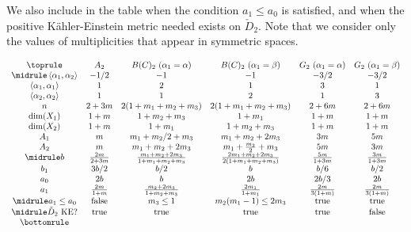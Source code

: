 \documentclass[JEP,XML,SOM,Unicode, NoEqCountersInSection, NoFloatCountersInSection]{cedram}
\theoremstyle{plain}
\theoremstyle{definition}
\begin{document}
We also include in the table when the condition $a_1\leq a_0$ is satisfied,
and when the positive Kähler-Einstein metric needed exists on $\check{D}_2$.
Note that we consider only the values of multiplicities that appear in symmetric spaces.

\begin{table}
\begin{small}
\begin{equation*}
\begin{array}{cccccc}
\toprule
& A_2 & B(C)_2~(\alpha_1=\alpha) & B(C)_2~(\alpha_1=\beta) & G_2~(\alpha_1=\alpha) & G_2~(\alpha_1=\beta) \\
\midrule
\left<\alpha_1,\alpha_2\right> & -1/2 & -1 & -1 & -3/2 & -3/2\\
\left<\alpha_1,\alpha_1\right> & 1 & 2 &1 & 3 & 1\\
\left<\alpha_2,\alpha_2\right> & 1 & 1 &2 & 1 & 3\\
n & 2+3m & 2(1+m_1+m_2+m_3) & 2(1+m_1+m_2+m_3) & 2+6m & 2+6m \\
\dim(X_1) & 1+m & 1+m_2+m_3 & 1+m_1 & 1+m & 1+m \\
\dim(X_2) & 1+m & 1+m_1 & 1+m_2+m_3 & 1+m & 1+m \\
A_1 & m & m_1+m_2/2+m_3 & m_1+m_2+2m_3 & 3m & 5m \\
A_2 & m & m_1+m_2+2m_3 & m_1+\frac{m_2}{2}+m_3 & 5m & 3m \\
\midrule
b & \frac{2m}{2+3m} & \frac{m_1+m_2+2m_3}{1+m_1+m_2+m_3} & \frac{2m_1+m_2+2m_3}{2(1+m_1+m_2+m_3)} & \frac{5m}{1+3m} & \frac{3m}{1+3m} \\
b_1 & 3b/2 & b/2 & b & b/6 & b/2 \\
a_0 & 2b & b & 2b & 2b/3 & 2b \\
a_1 & \frac{2m}{1+m} & \frac{m_2+2m_3}{1+m_2+m_3} & \frac{2m_1}{1+m_1} & \frac{2m}{3(1+m)} & \frac{2m}{3(1+m)} \\
\midrule
a_1\leq a_0 & \mathrm{false} & m_3\leq 1 & m_2(m_1-1)\leq 2m_3 & \mathrm{true} & \mathrm{true} \\
\midrule
\check{D}_2~\mathrm{KE?} & \mathrm{true} & \mathrm{true} & \mathrm{true} & \mathrm{true} & \mathrm{false} \\
\bottomrule
\end{array}
\end{equation*}
\end{small}
\caption{Notable constants and conditions}
\label{tab:constants}
\end{table}

\backmatter


\end{document}
